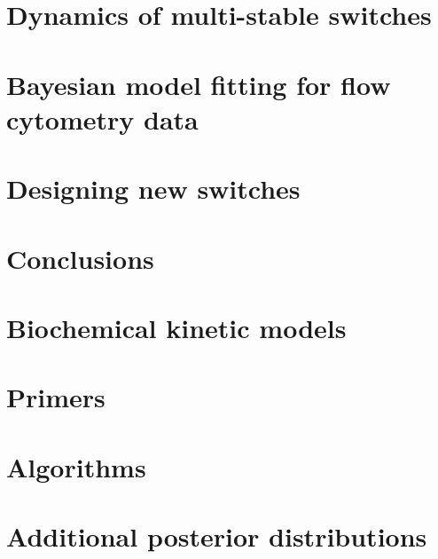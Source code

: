 \documentclass[]{phdthesis}
\begin{document}
\mainmatter*
 
\chapter{Dynamics of multi-stable switches}
\label{ch:SF}

%
%
%
%
%


\mainmatter*
\chapter{Bayesian model fitting for flow cytometry data}
\label{ch:Flow}

%
%

\mainmatter*
\chapter{Designing new switches}
\label{ch:desSw}


\mainmatter*
\chapter{Conclusions}
\label{ch:Conc}


\printbibliography 


\appendix
\chapter{Biochemical kinetic models}
\label{ap:ODEs}


\chapter{Primers}
\label{ap:Prim}


\chapter{Algorithms}
\label{ap:Alg}


\chapter{Additional posterior distributions}
\label{ap:figures}

\end{document}
